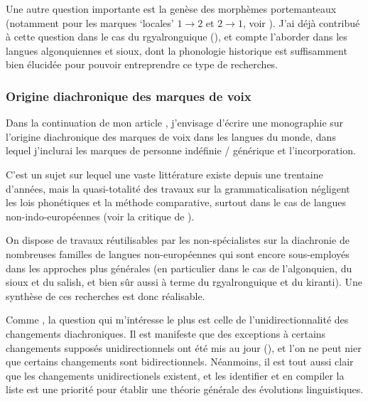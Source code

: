 \documentclass[oldfontcommands,oneside,a4paper,11pt]{article}
\begin{document}
 Une autre question importante est la genèse des morphèmes portemanteaux  (notamment pour les marques `locales' $1\rightarrow2$ et $2\rightarrow1$, voir \citealt{heath98skewing}). J'ai déjà contribué à cette question dans le cas du rgyalronguique (\citealt{jacques15generic}), et compte l'aborder dans les langues algonquiennes et sioux, dont la phonologie historique est suffisamment bien élucidée pour pouvoir entreprendre ce type de recherches. 
 
 
 \subsubsection{Origine diachronique des marques de voix} 
Dans  la continuation de mon article \citet{jacques14antipassive}, j'envisage d'écrire une monographie sur l'origine diachronique des marques de voix dans les langues du monde, dans lequel j'inclurai les marques de personne indéfinie / générique et l'incorporation.

C'est un sujet sur lequel une vaste littérature  existe depuis une trentaine d'années, mais la quasi-totalité des travaux sur la grammaticalisation négligent les lois phonétiques et la méthode comparative, surtout dans le cas de langues non-indo-européennes (voir la critique de \citealt{heath98hermit}).

On dispose de travaux réutilisables par les non-spécialistes sur la diachronie de nombreuses familles de langues non-européennes qui sont encore sous-employés dans les approches plus générales (en particulier dans le cas de l'algonquien, du sioux et du salish, et bien sûr aussi à terme du rgyalronguique et du kiranti). Une synthèse de ces recherches est donc réalisable.

 Comme \citet{haspelmath90passive}, la question qui m'intéresse le plus est celle de l'unidirectionnalité des changements diachroniques. Il est manifeste que des exceptions à certains changements supposés unidirectionnels ont été mis au jour (\citealt{norde09degrammaticalization}), et  l'on ne peut nier que certains changements sont bidirectionnels. Néanmoins, il est tout aussi clair que les changements unidirectionels existent, et les identifier et en compiler la liste est une priorité pour établir une théorie générale des évolutions linguistiques.  
 
 
\end{document}
